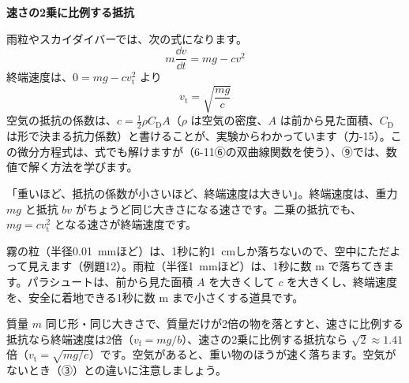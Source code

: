 \begin{bkcenter}
\end{bkcenter}

\noindent\textbf{速さの2乗に比例する抵抗}\par
\noindent 雨粒やスカイダイバーでは、次の式になります。
\[ m\frac{\dd v}{\dd t}=mg-cv^2 \]終端速度は、$0=mg-cv_{\mathrm t}^2$ より
\[ v_{\mathrm t}=\sqrt{\frac{mg}{c}} \]
空気の抵抗の係数は、$c=\tfrac{1}{2}\rho C_{\mathrm D}A$（$\rho$ は空気の密度、$A$ は前から見た面積、$C_{\mathrm D}$ は形で決まる抗力係数）と書けることが、実験からわかっています（力-15）。この微分方程式は、式でも解けますが（6-11⑥の双曲線関数を使う）、⑨では、数値で解く方法を学びます。

\begin{phyomi}[$v_{\mathrm f}=\dfrac{mg}{b}$]
「重いほど、抵抗の係数が小さいほど、終端速度は大きい」。終端速度は、重力 $mg$ と抵抗 $bv$ がちょうど同じ大きさになる速さです。二乗の抵抗でも、$mg=cv_{\mathrm t}^2$ となる速さが終端速度です。
\end{phyomi}
\begin{phmijika}
霧の粒（半径\qty{0.01}{mm}ほど）は、1秒に約\qty{1}{cm}しか落ちないので、空中にただよって見えます（例題12）。雨粒（半径\qty{1}{mm}ほど）は、1秒に数 m で落ちてきます。パラシュートは、前から見た面積 $A$ を大きくして $c$ を大きくし、終端速度を、安全に着地できる1秒に数 m まで小さくする道具です。
\end{phmijika}

\begin{phbaisuru}{質量 $m$}
同じ形・同じ大きさで、質量だけが2倍の物を落とすと、速さに比例する抵抗なら終端速度は2倍（$v_{\mathrm f}=mg/b$）、速さの2乗に比例する抵抗なら $\sqrt2\approx1.41$ 倍（$v_{\mathrm t}=\sqrt{mg/c}$）です。空気があると、重い物のほうが速く落ちます。空気がないとき（③）との違いに注意しましょう。
\end{phbaisuru}

